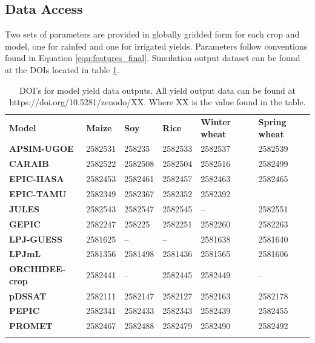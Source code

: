 \documentclass[esd, manuscript]{copernicus} %
\begin{document}
\subsection{Data Access}
\label{A:3}
Two sets of parameters are provided in globally gridded form for each crop and model, one for rainfed and one for irrigated yields. Parameters follow conventions found in Equation \ref{eqn:features_final}. Simulation output dataset can be found at the DOIs located in table \ref{table:dataloc}.

\begin{table}[t]
\caption{DOI's for model yield data outputs. All yield output data can be found at https://doi.org/10.5281/zenodo/XX. Where XX is the value found in the table.} 
\label{table:dataloc}
	\begin{tabular}{p{3cm} p{1.5cm} p{1.5cm} p{1.5cm} p{1.5cm} p{1.5cm}}
        \tophline
        {\textbf{Model}}&{\textbf{Maize}}&{\textbf{Soy}}&{\textbf{Rice}}&{\textbf{Winter wheat}}&{\textbf{Spring wheat}}\\ \middlehline
        {\textbf{APSIM-UGOE}} & {2582531} & {258235} & {2582533} & {2582537} & {2582539}\\ \middlehline
        {\textbf{CARAIB}} & {2582522} & {2582508} & {2582504} & {2582516} & {2582499}\\ \middlehline
        {\textbf{EPIC-IIASA}} & {2582453} & {2582461} & {2582457} & {2582463} & {2582465}\\  \middlehline
        {\textbf{EPIC-TAMU}} & {2582349} & {2582367} & {2582352} & {2582392} & {2582418\\ \middlehline
        {\textbf{JULES}} & {2582543} & {2582547} & {2582545} & {--} & {2582551}\\ \middlehline
        {\textbf{GEPIC}} & {2582247} & {258225} & {2582251} & {2582260} & {2582263}\\ \middlehline
        {\textbf{LPJ-GUESS}} & {2581625} & {--} & {--} & {2581638} & {2581640}\\  \middlehline
        {\textbf{LPJmL}} & {2581356} & {2581498} & {2581436} & {2581565} & {2581606}\\ \middlehline
        {\textbf{ORCHIDEE-crop}} & {2582441} & {--} & {2582445} & {2582449} & {--}\\ \middlehline
        {\textbf{pDSSAT}} & {2582111} & {2582147} & {2582127} & {2582163} & {2582178}\\ \middlehline
        {\textbf{PEPIC}} & {2582341} & {2582433} & {2582343} & {2582439} & {2582455}\\ \middlehline
        {\textbf{PROMET}} & {2582467} & {2582488} & {2582479} & {2582490} & {2582492}\\
        \bottomhline
    \end{tabular}
\end{table}
\noappendix %
\end{document}
